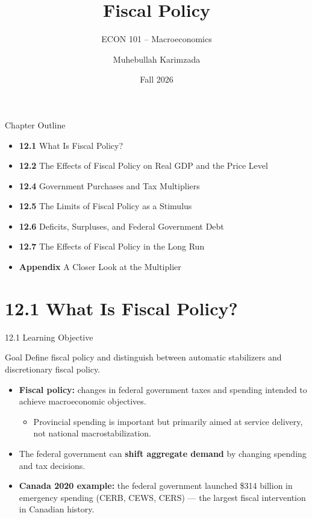 \documentclass[aspectratio=169]{beamer}
\title{\textbf{Fiscal Policy}}
\subtitle{{\large ECON 101 -- Macroeconomics}}
\author{Muhebullah Karimzada}
\date{Fall 2026}
\begin{document}

\begin{frame}[plain]
  \titlepage
\end{frame}

\begin{frame}{Chapter Outline}
\transfade
\begin{itemize}
  \item \textbf{12.1} What Is Fiscal Policy?
  \item \textbf{12.2} The Effects of Fiscal Policy on Real GDP and the Price Level
  \item \textbf{12.4} Government Purchases and Tax Multipliers
  \item \textbf{12.5} The Limits of Fiscal Policy as a Stimulus
  \item \textbf{12.6} Deficits, Surpluses, and Federal Government Debt
  \item \textbf{12.7} The Effects of Fiscal Policy in the Long Run
  \item \textbf{Appendix} A Closer Look at the Multiplier
\end{itemize}
\end{frame}

\section{12.1 What Is Fiscal Policy?}

\begin{frame}{12.1 Learning Objective}
\transfade
\begin{block}{Goal}
Define fiscal policy and distinguish between automatic stabilizers and discretionary fiscal policy.
\end{block}
\begin{itemize}
  \item \textbf{Fiscal policy:} changes in \alert{federal government taxes and spending} intended to achieve macroeconomic objectives.
  \begin{itemize}
    \item Provincial spending is important but primarily aimed at service delivery, not national macrostabilization.
  \end{itemize}
  \item The federal government can \textbf{shift aggregate demand} by changing spending and tax decisions.
  \item \textbf{Canada 2020 example:} the federal government launched \$314 billion in emergency spending (CERB, CEWS, CERS) --- the largest fiscal intervention in Canadian history.
\end{itemize}
\end{frame}
\end{document}
